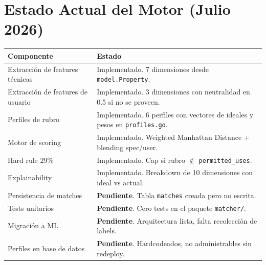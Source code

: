 \documentclass[11pt,a4paper]{article}
\begin{document}
\section{Estado Actual del Motor (Julio 2026)}
\begin{table}[H]
    \centering
    \renewcommand{\arraystretch}{1.2}
    \begin{tabularx}{\textwidth}{>{\hsize=0.3\hsize}X >{\hsize=0.7\hsize}X}
        \toprule
        \textbf{Componente} & \textbf{Estado} \\
        \midrule
        Extracción de features técnicas & Implementado. 7 dimensiones desde \texttt{model.Property}. \\
        Extracción de features de usuario & Implementado. 3 dimensiones con neutralidad en 0.5 si no se proveen. \\
        Perfiles de rubro & Implementado. 6 perfiles con vectores de ideales y pesos en \texttt{profiles.go}. \\
        Motor de scoring & Implementado. Weighted Manhattan Distance + blending spec/user. \\
        Hard rule 29\% & Implementado. Cap si rubro $\notin$ \texttt{permitted\_uses}. \\
        Explainability & Implementado. Breakdown de 10 dimensiones con ideal vs actual. \\
        Persistencia de matches & \textbf{Pendiente}. Tabla \texttt{matches} creada pero no escrita. \\
        Tests unitarios & \textbf{Pendiente}. Cero tests en el paquete \texttt{matcher/}. \\
        Migración a ML & \textbf{Pendiente}. Arquitectura lista, falta recolección de labels. \\
        Perfiles en base de datos & \textbf{Pendiente}. Hardcodeados, no administrables sin redeploy. \\
        \bottomrule
    \end{tabularx}
\end{table}
\end{document}
